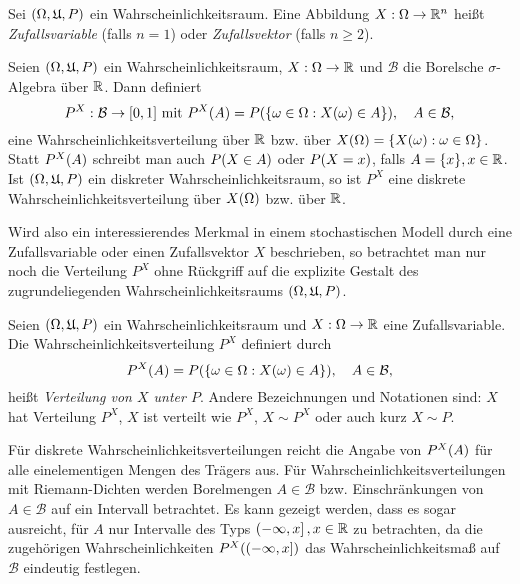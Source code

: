 \documentclass{lecture}
\begin{document}
    \begin{definition}
        Sei \(\parentheses*{\Omega, \mathfrak{U}, P}\) ein Wahrscheinlichkeitsraum.
        Eine Abbildung \(X: \Omega \to \R^n\) heißt \emph{Zufallsvariable} (falls \(n = 1\)) oder \emph{Zufallsvektor} (falls \(n \ge 2\)).
    \end{definition}

    \begin{lemma}
        Seien \(\parentheses*{\Omega, \mathfrak{U}, P}\) ein Wahrscheinlichkeitsraum, \(X: \Omega \to \R\) und \(\mathcal{B}\) die Borelsche \(\sigma\)-Algebra über \(\R\).
        Dann definiert
        \[
            P^X: \mathcal{B} \to \brackets*{0, 1}\text{ mit }P^X\parentheses*{A} = P\parentheses*{\braces*{\omega \in \Omega : X\parentheses*{\omega} \in A}}, \quad A \in \mathcal{B},
        \]
        eine Wahrscheinlichkeitsverteilung über \(\R\) bzw. über \(X\parentheses*{\Omega} = \braces*{X\parentheses*{\omega} : \omega \in \Omega}\).
        Statt \(P^X\parentheses*{A}\) schreibt man auch \(P\parentheses*{X \in A}\) oder \(P\parentheses*{X = x}\), falls \(A = \braces*{x}, x \in \R\).
        Ist \(\parentheses*{\Omega, \mathfrak{U}, P}\) ein diskreter Wahrscheinlichkeitsraum, so ist \(P^X\) eine diskrete Wahrscheinlichkeitsverteilung über \(X\parentheses*{\Omega}\) bzw. über \(\R\).
    \end{lemma}

    Wird also ein interessierendes Merkmal in einem stochastischen Modell durch eine Zufallsvariable oder einen Zufallsvektor \(X\) beschrieben, so betrachtet man nur noch die Verteilung \(P^X\) ohne Rückgriff auf die explizite Gestalt des zugrundeliegenden Wahrscheinlichkeitsraums \(\parentheses*{\Omega, \mathfrak{U}, P}\).

    \begin{definition}
        Seien \(\parentheses*{\Omega, \mathfrak{U}, P}\) ein Wahrscheinlichkeitsraum und \(X: \Omega \to \R\) eine Zufallsvariable.
        Die Wahrscheinlichkeitsverteilung \(P^X\) definiert durch
        \[
            P^X\parentheses*{A} = P\parentheses*{\braces*{\omega \in \Omega : X\parentheses*{\omega} \in A}}, \quad A \in \mathcal{B},
        \]
        heißt \emph{Verteilung von \(X\) unter \(P\)}.
        Andere Bezeichnungen und Notationen sind: \(X\) hat Verteilung \(P^X\), \(X\) ist verteilt wie \(P^X\), \(X \sim P^X\) oder auch kurz \(X \sim P\).
    \end{definition}

    \begin{remark}
        Für diskrete Wahrscheinlichkeitsverteilungen reicht die Angabe von \(P^X\parentheses*{A}\) für alle einelementigen Mengen des Trägers aus.
        Für Wahrscheinlichkeitsverteilungen mit Riemann-Dichten werden Borelmengen \(A \in \mathcal{B}\) bzw. Einschränkungen von \(A \in \mathcal{B}\) auf ein Intervall betrachtet.
        Es kann gezeigt werden, dass es sogar ausreicht, für \(A\) nur Intervalle des Typs \(\left(-\infty, x\right], x \in \R\) zu betrachten, da die zugehörigen Wahrscheinlichkeiten \(P^X\parentheses*{\left(-\infty, x\right]}\) das Wahrscheinlichkeitsmaß auf \(\mathcal{B}\) eindeutig festlegen.
    \end{remark}
\end{document}
